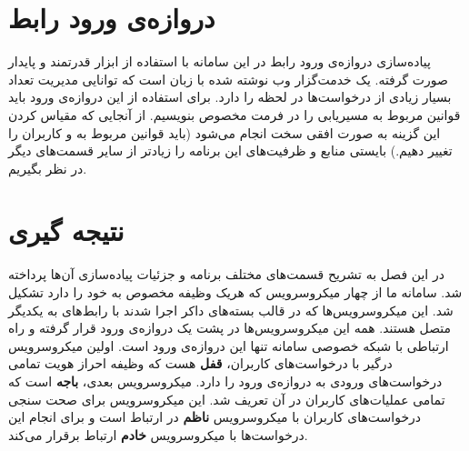 \section{‌دروازه‌ی ورود رابط}
پیاده‌سازی ‌دروازه‌ی ورود رابط در این سامانه با استفاده از ابزار قدرتمند و پایدار  صورت گرفته.  یک خدمت‌گزار وب نوشته شده با زبان  است که توانایی مدیریت تعداد بسیار زیادی از درخواست‌ها در لحظه را دارد. برای استفاده از این ‌دروازه‌ی ورود باید قوانین مربوط به مسیریابی را در فرمت مخصوص بنویسیم. از آنجایی که مقیاس کردن این گزینه به صورت افقی سخت انجام می‌شود (باید قوانین مربوط به  و کاربران را تغییر دهیم.) بایستی منابع و ظرفیت‌های این برنامه‌ را زیاد‌تر از سایر قسمت‌های دیگر در نظر بگیریم.



\section{نتیجه گیری}
در این فصل به تشریح قسمت‌های مختلف برنامه و جزئیات پیاده‌سازی آن‌ها پرداخته شد. سامانه ما از چهار میکروسرویس که هریک وظیفه مخصوص به خود را دارد تشکیل شد. این میکروسرویس‌ها که در قالب بسته‌های داکر اجرا شدند با رابط‌های  به یکدیگر متصل هستند. همه این میکروسرویس‌ها در پشت یک ‌دروازه‌ی ورود قرار گرفته و راه ارتباطی با شبکه خصوصی سامانه تنها این ‌دروازه‌ی ورود است. اولین میکروسرویس درگیر با درخواست‌های کاربران، \textbf{قفل} هست که وظیفه احراز هویت تمامی درخواست‌های ورودی به ‌دروازه‌ی ورود را دارد. میکروسرویس بعدی، \textbf{باجه} است که تمامی عملیات‌های کاربران در آن تعریف شد. این میکروسرویس برای صحت سنجی درخواست‌های کاربران با میکروسرویس \textbf{ناظم} در ارتباط است و برای انجام این درخواست‌ها با میکروسرویس \textbf{خادم} ارتباط برقرار می‌کند.

